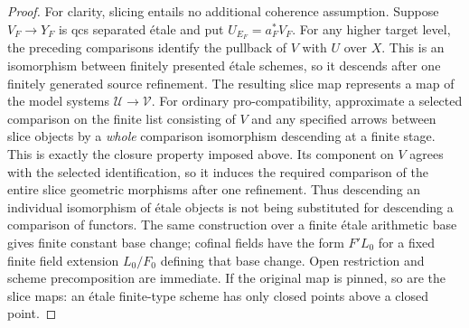 \begin{proof}
For clarity, slicing entails no additional coherence assumption.
Suppose \(V_F\to Y_F\) is qcs separated étale and put
\(U_{E_F}=a_F^*V_F\). For any higher target level, the preceding
comparisons identify the pullback of \(V\) with \(U\) over \(X\).
This is an isomorphism between finitely presented étale schemes,
so it descends after one finitely generated source refinement.
The resulting slice map represents a map of the model systems
\(\mathcal U\to\mathcal V\). For ordinary pro-compatibility,
approximate a selected comparison on the finite list consisting
of \(V\) and any specified arrows between slice objects by a
\emph{whole} comparison isomorphism descending at a finite stage.
This is exactly the closure property imposed above. Its component
on \(V\) agrees with the selected identification, so it induces
the required comparison of the entire slice geometric morphisms
after one refinement. Thus descending an individual isomorphism
of étale objects is not being substituted for descending a
comparison of functors. The same construction
over a finite étale arithmetic base gives finite constant base
change; cofinal fields have the form \(F'L_0\) for a fixed finite
field extension \(L_0/F_0\) defining that base change. Open
restriction and scheme precomposition are immediate. If the
original map is pinned, so are the slice maps: an étale
finite-type scheme has only closed points above a closed point.
\end{proof}

